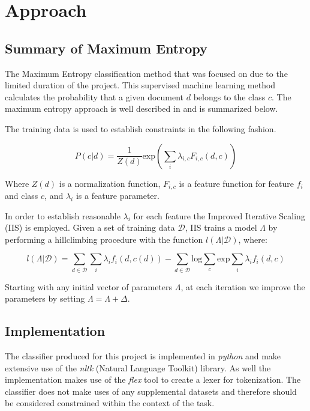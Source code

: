 \documentclass[12pt]{article}
\begin{document}

\section{Approach}

\subsection{Summary of Maximum Entropy}

The Maximum Entropy classification method that was focused on due to the
limited duration of the project. This supervised machine learning method
calculates the probability that a given document $d$ belongs to the class $c$.
The maximum entropy approach is well described in \cite{Nigam1999} and is
summarized below.

The training data is used to establish constraints in the following fashion.

\begin{equation}
    P(c | d) = \frac{1}{Z(d)} \mathrm{exp}(\sum\limits_{i} \lambda _{i,c} F_{i,c}(d,c) )
\end{equation}

Where $Z(d)$ is a normalization function, $F_{i,c}$ is a feature function for
feature $f_{i}$ and class $c$, and $\lambda_{i}$ is a feature parameter.

In order to establish reasonable $\lambda_{i}$ for each feature the Improved
Iterative Scaling (IIS) is employed. Given a set of training data
$\mathcal{D}$, IIS trains a model $\Lambda$ by performing a hillclimbing
procedure with the function $l(\Lambda|\mathcal{D})$, where:

\begin{equation}
    l(\Lambda | \mathcal{D}) = \sum\limits_{d\in\mathcal{D}} \sum\limits_{i}
    \lambda_{i} f_{i}(d,c(d)) - \sum\limits_{d\in\mathcal{D}} \mathrm{log}
    \sum\limits_{c} \mathrm{exp} \sum\limits_{i} \lambda_{i} f_{i}(d,c)
\end{equation}

Starting with any initial vector of parameters $\Lambda$, at each iteration
we improve the parameters by setting $\Lambda = \Lambda + \Delta$.


\subsection{Implementation}

The classifier produced for this project is implemented in \textit{python} and
make extensive use of the \textit{nltk} (Natural Language Toolkit) library. As
well the implementation makes use of the \textit{flex} tool to create a lexer
for tokenization. The classifier does not make uses of any supplemental
datasets and therefore should be considered constrained within the context of
the task.
\end{document}
